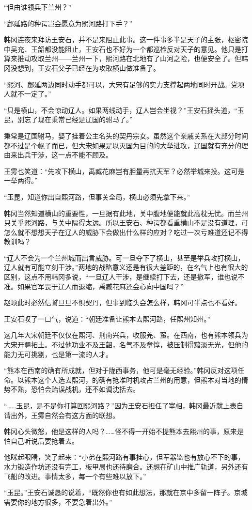 “但由谁领兵下兰州？”

“鄜延路的种谔岂会愿意为熙河路打下手？”

韩冈连夜来拜访王安石，并不是来阻止此事。这一件事多半是天子的主张，枢密院中吴充、王韶都没能阻止，王安石也不好为一个都巡检反对天子的意见。他只是打算来推动攻取兰州——兰州一下，熙河路在北地有了山河之险，也便安全了。但韩冈没想到，王安石父子已经在为攻取横山做准备了。

“熙河、鄜延两边同时动手都可以，大宋有足够的实力支撑起两地同时开战。党项人就不一定了。”

“只是横山，不会惊动辽人。如果两线动手，辽人岂会坐视？”王安石摇头道，“玉昆，别忘了现在秉常已经是辽国的驸马了。”

秉常是辽国驸马，娶了挂着公主名头的契丹宗女。虽然这个亲戚关系在大部分时间都不过是个幌子而已，但大宋如果是以灭国为目的的大举进攻，辽国就有充分的理由来出兵干涉，这一点不能不顾及。

王雱也笑道：“先攻下横山，禹臧花麻岂有胆量再抗天军？必然举城来投。这可是一举两得。”

“玉昆，知道你出自熙河路，但事关全局，横山必须先拿下来。”

韩冈当然知道横山的重要性，一旦据有此地，关中腹地便能就此高枕无忧。而兰州只关乎熙河路，与关中隔得太远。所以王安石、种谔都看重横山不是没有道理，可怎么就不想想天子在辽人的威胁下会做出什么样的应对？吃过一次亏难道还记不得教训吗？

“辽人不会为一个兰州城而出言威胁。可一旦夺下了横山，甚至是举兵攻打横山，辽人就有可能立刻干涉。”两地的战略意义还是有很大差距的，在名气上也有很大的区别，这点不用韩冈多说，“一旦辽人干涉，是继续打下去，还是撤军，谁也说不准。如果官军畏于辽人而退缩，禹臧花麻还会心向中国吗？”

赵顼此时必然信誓旦旦不惧契丹，但事到临头会怎么样，韩冈可半点也不看好。

王安石叹了一口气，说道：“朝廷准备让熊本去熙河路，任熙州知州。”

这几年大宋朝廷不仅仅在熙河、荆南兴兵，收服羌、蛮。在西南，也有熊本领兵为大宋开疆拓土。不过他功业不及王韶，名气不及章惇，被压制得黯淡无光，但他的能力无可挑剔，也是第一流的人才。

“熊本在西南的确有所成就，但对于陇西事务，他可是毫无经验。”韩冈反对这项任命。以熊本这个人选去熙河，的确有抢准时机攻占兰州的用意，但熊本对当地的情势不熟，恐怕会贻误战机，还不如调沈括去。

“……玉昆，是不是你打算回熙河路？”因为王安石担任了宰相，韩冈最近就上表自请出外，王雱自然会有这方面的联想。

韩冈心头微怒，他是这样的人吗？……怪不得一开始不提熊本去熙州的事，原来是怕自己听说后要抢着去。

他眯起眼睛，笑了起来：“小弟在熙河路有事挂心，但军器监也有放心不下的事，水力锻造作坊还没有完工，板甲局也还待磨合。还想在矿山中推广轨道，另外还有飞船的改进。事情太多，每一个有些难以放下。”

“玉昆。”王安石诚恳的说着，“既然你也有如此想法，那就在京中多留一阵子。京城需要你的地方很多，不要急着出外。”

